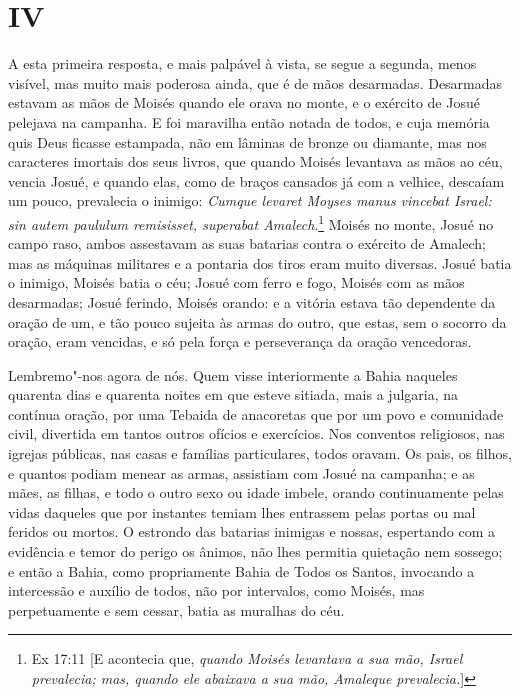 \section*{IV}

A esta primeira resposta, e mais palpável à vista, se segue a
segunda, menos visível, mas muito mais poderosa ainda, que é de mãos
desarmadas. Desarmadas estavam as mãos de Moisés quando ele orava no
monte, e o exército de Josué pelejava na campanha. E foi maravilha então
notada de todos, e cuja memória quis Deus ficasse estampada, não em
lâminas de bronze ou diamante, mas nos caracteres imortais dos seus
livros, que quando Moisés levantava as mãos ao céu, vencia Josué, e
quando elas, como de braços cansados já com a velhice, descaíam um
pouco, prevalecia o inimigo: \emph{Cumque levaret Moyses manus vincebat
Israel: sin autem paululum remisisset, superabat Amalech}.\footnote{Ex 17:11 [E acontecia que, \textit{quando Moisés levantava a sua mão, Israel prevalecia; mas, quando ele abaixava a sua mão, Amaleque prevalecia.}]}
Moisés no monte, Josué no campo raso, ambos assestavam as suas batarias
contra o exército de Amalech; mas as máquinas militares e a pontaria dos
tiros eram muito diversas. Josué batia o inimigo, Moisés batia o céu;
Josué com ferro e fogo, Moisés com as mãos desarmadas; Josué ferindo,
Moisés orando: e a vitória estava tão dependente da oração de um, e tão
pouco sujeita às armas do outro, que estas, sem o socorro da oração,
eram vencidas, e só pela força e perseverança da oração vencedoras.

Lembremo"-nos agora de nós. Quem visse interiormente a Bahia
naqueles quarenta dias e quarenta noites em que esteve sitiada, mais a
julgaria, na contínua oração, por uma Tebaida de anacoretas que por um
povo e comunidade civil, divertida em tantos outros ofícios e
exercícios. Nos conventos religiosos, nas igrejas públicas, nas casas e
famílias particulares, todos oravam. Os pais, os filhos, e quantos
podiam menear as armas, assistiam com Josué na campanha; e as mães, as
filhas, e todo o outro sexo ou idade imbele, orando continuamente pelas
vidas daqueles que por instantes temiam lhes entrassem pelas portas ou
mal feridos ou mortos. O estrondo
das batarias inimigas e nossas, espertando com a evidência e temor
do perigo os ânimos, não lhes permitia quietação nem sossego; e então a
Bahia, como propriamente Bahia de Todos os Santos, invocando a
intercessão e auxílio de todos, não por intervalos, como Moisés, mas
perpetuamente e sem cessar, batia as muralhas do céu.


